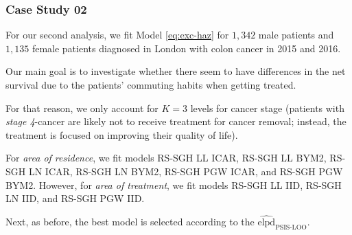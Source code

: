 \documentclass[10pt, aspectratio = 169, handout]{beamer} %
\begin{document}
    \begin{frame}[t]
		\frametitle{Case Study 02}
		\justifying

            For our second analysis, we fit \textcolor{titles}{Model \eqref{eq:exc-haz}} for $1,342$ male patients and $1,135$ female patients diagnosed in London with colon cancer in 2015 and 2016. 

            \pause
            \vspace{5pt}
            
            Our main goal is to investigate whether there seem to have differences in the net survival due to the patients' commuting habits when getting treated. 

            \pause
            \vspace{5pt}
            
            For that reason, we only account for $K = 3$ levels for cancer stage (patients with \textit{stage 4}-cancer are likely not to receive treatment for cancer removal; instead, the treatment is focused on improving their quality of life).

            \pause
            \vspace{5pt}
            
            For \textit{area of residence}, we fit models RS-SGH LL ICAR, RS-SGH LL BYM2, RS-SGH LN ICAR, RS-SGH LN BYM2, RS-SGH PGW ICAR, and RS-SGH PGW BYM2. However, for \hspace{-1pt}\textit{area of treatment}, \hspace{-1pt}we fit models \hspace{-1pt}RS-SGH LL IID,\hspace{-1pt} RS-SGH LN IID, and RS-SGH PGW IID.

            \pause
            \vspace{5pt}

            Next, as before, the best model is selected according to the $\widehat{\text{elpd}}_{\text{PSIS-LOO}}$.

	\end{frame}
\end{document}
